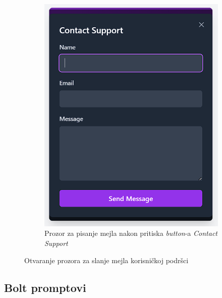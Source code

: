\begin{itemize}
\begin{figure}[H]
\begin{subfigure}[b]{0.45\textwidth}
        \includegraphics[width=\linewidth]{Slike/FZ6/contactsupport.png}
        \caption{Prozor za pisanje mejla nakon pritiska \textit{button}-a \textit{Contact Support}}
        \label{fig:contactsupport}
    \end{subfigure}
    \caption{Otvaranje prozora za slanje mejla korisničkoj podršci}
\end{figure}
\end{itemize}  

\subsection{Bolt promptovi}

